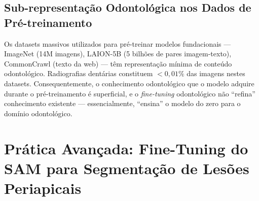 \subsection{Sub-representação Odontológica nos Dados de Pré-treinamento}

Os datasets massivos utilizados para pré-treinar modelos fundacionais --- ImageNet (14M imagens), LAION-5B (5 bilhões de pares imagem-texto), CommonCrawl (texto da web) --- têm representação mínima de conteúdo odontológico. Radiografias dentárias constituem $<0,01\%$ das imagens nestes datasets. Consequentemente, o conhecimento odontológico que o modelo adquire durante o pré-treinamento é superficial, e o \textit{fine-tuning} odontológico não ``refina'' conhecimento existente --- essencialmente, ``ensina'' o modelo do zero para o domínio odontológico.

\section{Prática Avançada: Fine-Tuning do SAM para Segmentação de Lesões Periapicais}

